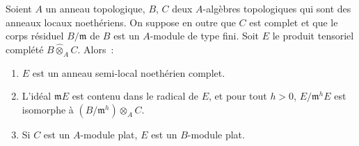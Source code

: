 \begin{lemma}[19.7.1.2]
\label{0.19.7.1.2-fr}
Soient $A$ un anneau topologique, $B$, $C$ deux $A$-algèbres topologiques qui
sont des anneaux locaux noethériens. On suppose en outre que $C$ est complet
et que le corps résiduel $B/\mathfrak m$ de $B$ est un $A$-module de type fini.
Soit $E$ le produit tensoriel complété $B\widehat\otimes_A C$. Alors~:
\begin{enumerate}
  \item[(i)] $E$ est un anneau semi-local noethérien complet.
  \item[(ii)] L'idéal $\mathfrak mE$ est contenu dans le radical de $E$, et
  pour tout $h>0$, $E/\mathfrak m^hE$ est isomorphe à
  $(B/\mathfrak m^h)\otimes_A C$.
  \item[(iii)] Si $C$ est un $A$-module plat, $E$ est un $B$-module plat.
\end{enumerate}
\end{lemma}


